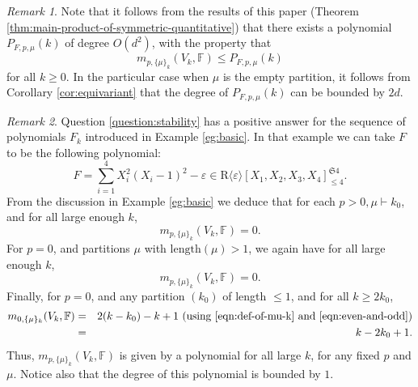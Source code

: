 \documentclass{amsart}
\theoremstyle{definition}
\theoremstyle{remark}
\newtheorem{remark}{Remark}
\numberwithin{equation}{section}
\begin{document}
\begin{remark}
Note that it follows from the results of this paper (Theorem \ref{thm:main-product-of-symmetric-quantitative}) that there exists a polynomial  
 $P_{F,p,\mu}(k)$ of degree $O(d^2)$,  with the property that 
 \[
 m_{p,\{\mu\}_k}(V_k,{\mathbb{F}}) \leq  P_{F,p,\mu}(k)
 \]
 for all $k \geq 0$. In the particular case when $\mu$ is the empty partition, it follows from Corollary \ref{cor:equivariant}
 that the degree of $P_{F,p,\mu}(k)$ can be bounded  by $2d$.
 \end{remark}
 
\begin{remark}
Question \ref{question:stability} has a positive answer for the sequence of polynomials $F_k$ introduced
in Example \ref{eg:basic}. In that example we can take $F$ to be the following polynomial:
\[
F = \sum_{i=1}^4 X_i^2(X_i-1)^2 - {{\varepsilon}} \in {\mathrm{R}}{{\langle}}{{\varepsilon}}{{\rangle}}[X_1,X_2,X_3,X_4]^{\mathfrak{S}4}_{\leq 4}.
\] 
From the discussion in Example \ref{eg:basic} we deduce that for each $p>0,\mu \vdash k_0$, and for all large enough $k$,
\[
m_{p,\{\mu\}_k}(V_k,{\mathbb{F}}) = 0.
\]
For $p=0$, and partitions $\mu$ with ${\mathrm{length}}(\mu) >1$, we again have for all large enough $k$,
\[
m_{p,\{\mu\}_k}(V_k,{\mathbb{F}}) = 0.
\] 
Finally, for  $p=0$, and any partition $(k_0)$ of length $\leq 1$, and  for all $k \geq  2 k_0$,
\begin{eqnarray*}
m_{0,\{\mu\}_k}(V_k,{\mathbb{F}}) &=& 2(k-k_0) -k+1  \mbox{ (using \eqref{eqn:def-of-mu-k} and \eqref{eqn:even-and-odd})}\\
				      &=& k  - 2k_0 +1.
\end{eqnarray*}
Thus, $m_{p,\{\mu\}_k}(V_k,{\mathbb{F}})$ is given by a polynomial for all large $k$, for any fixed $p$ and $\mu$.
Notice also that the degree of this polynomial is bounded by $1$.
\end{remark}
\end{document}
